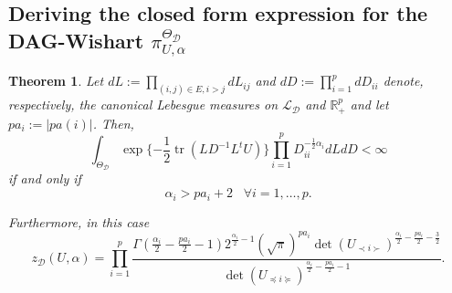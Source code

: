 \documentclass[12pt]{article}
\newcommand{\R}{\mathbb{R}}
\DeclareMathOperator{\tr}{tr}
\newcommand{\D}{\mathcal{D}}
\theoremstyle{plain}
\newtheorem{theorem}{Theorem}[section]
\theoremstyle{definition}
\theoremstyle{remark}
\begin{document}
\subsection{Deriving the closed form expression for the DAG-Wishart $\pi_{U,\alpha}^{\Theta_{\D}}$}

\begin{theorem} \label{nrmcnstdml}
Let $dL := \prod_{(i,j) \in E, i>j} dL_{ij}$ and $dD := \prod_{i=1}^p dD_{ii}$ denote, respectively,  the canonical Lebesgue measures on $\mathcal{L}_{\D}$  and  $\R^p_{+}$ and let $pa_i:=|pa(i)|$. Then,
$$
 \int_{\Theta_{\D}}\exp\{- \frac{1}{2}\tr( LD^{-1}L^t U)\}
\prod_{i=1}^p D^{-\frac{1}{2}\alpha_i}_{ii} dL dD < \infty
$$
if and only if
$$\alpha_i > pa_i + 2 \;\;\; \forall i = 1,\ldots, p. $$  

\noindent Furthermore, in this case 
\begin{equation} \label{nrmlcnsten}
z_{\D} (U, \alpha) = \prod_{i=1}^p \frac{\Gamma \left( \frac{\alpha_i}{2} -
\frac{pa_i}{2} - 1 \right) 2^{\frac{\alpha_i}{2} - 1}
(\sqrt{\pi})^{pa_i} \det( U_{\prec i\succ})^{\frac{\alpha_i}{2} -
\frac{pa_i}{2} - \frac{3}{2}}}{\det( U_{\preceq i\succeq})^{\frac{\alpha_i}{2} - \frac{pa_i}{2} - 1}}.
\end{equation}
\end{theorem}
\end{document}
